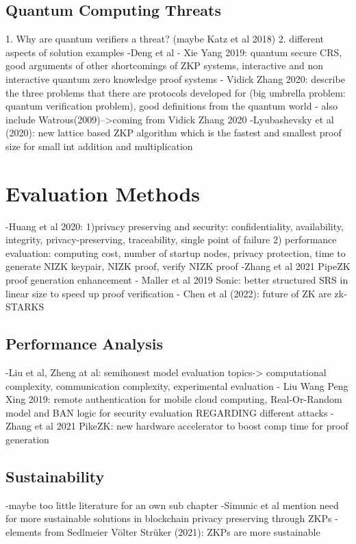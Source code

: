 \subsection{Quantum Computing Threats}
1. Why are quantum verifiers a threat? (maybe Katz et al 2018)
2. different aspects of solution examples
-Deng et al 
- Xie Yang 2019: quantum secure CRS, good arguments of other shortcomings of ZKP systems, interactive and non interactive quantum zero knowledge proof systems
- Vidick Zhang 2020: describe the three problems that there are protocols developed for (big umbrella problem: quantum verification problem), good definitions from the quantum world
- also include Watrous(2009)-->coming from Vidick Zhang 2020
-Lyubashevsky et al (2020): new lattice based ZKP algorithm which is the fastest and smallest proof size for small int addition and multiplication 

\section{Evaluation Methods}
-Huang et al 2020: 1)privacy preserving and security: confidentiality, availability, integrity, privacy-preserving, traceability, single point of failure 2) performance evaluation: computing cost, number of startup nodes, privacy protection, time to generate NIZK keypair, NIZK proof, verify NIZK proof
-Zhang et al 2021 PipeZK proof generation enhancement
- Maller et al 2019 Sonic: better structured SRS in linear size to speed up proof verification
- Chen et al (2022): future of ZK are zk-STARKS
\subsection{Performance Analysis}
-Liu et al, Zheng at al: semihonest model evaluation topics-> computational complexity, communication complexity, experimental evaluation
- Liu Wang Peng Xing 2019: remote authentication for mobile cloud computing, Real-Or-Random model and BAN logic for security evaluation REGARDING different attacks
- Zhang et al 2021 PikeZK: new hardware accelerator to boost comp time for proof generation

\subsection{Sustainability}
-maybe too little literature for an own sub chapter
-Simunic et al mention need for more sustainable solutions in blockchain privacy preserving through ZKPs
-elements from Sedlmeier Völter Strüker (2021): ZKPs are more sustainable 

